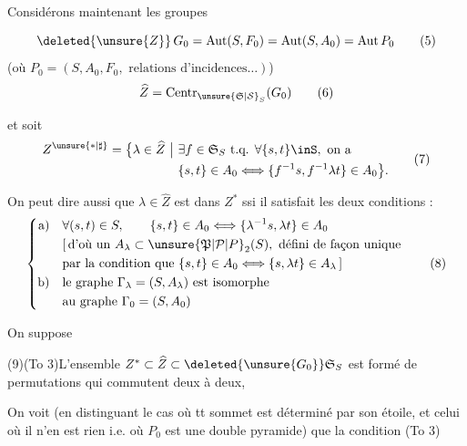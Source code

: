 Considérons maintenant les  groupes


\[
\deleted{\unsure{Z}}\,G_0=\mathrm{Aut}(S,F_0)=\mathrm{Aut}(S,A_0)=\mathrm{Aut}\,P_0\tag*{(5)}
\]
(où $P_0=(S,A_0,F_0,\text{ relations d'incidences}\ldots)$)
\[
\widehat Z=\mathrm{Centr}_{\unsure{\mathfrak S|\mathcal S}_S}(G_0)\tag*{(6)}
\]

 et soit
\[
\begin{aligned}
Z^{\unsure{*|\sharp}}=\bigl\{\lambda\in\widehat Z\ \big|\ &\exists f\in\mathfrak S_S\ \text{t.q. }\forall\{s,t\}\inS,\ \text{on a}\\
&\{s,t\}\in A_0\Longleftrightarrow\{f^{-1}s,f^{-1}\lambda t\}\in A_0\bigr\}.
\end{aligned}\tag*{(7)}
\]

 On peut dire aussi que $\lambda\in\widehat Z$ est dans $Z^*$ ssi il satisfait les deux conditions :
\[
\left\{\begin{aligned}
\mathrm a)\quad &\forall(s,t)\in S,\qquad\{s,t\}\in A_0\Longleftrightarrow\{\lambda^{-1}s,\lambda t\}\in A_0\\
&[\,\text{d'où un } A_\lambda\subset\unsure{\mathfrak P|\mathcal P|P}_2(S),\ \text{défini de façon unique}\\
&\text{par la condition que }\{s,t\}\in A_0\Longleftrightarrow\{s,\lambda t\}\in A_\lambda\,]\\
\mathrm b)\quad &\text{le graphe }\Gamma_\lambda=(S,A_\lambda)\text{ est isomorphe}\\
&\text{au graphe }\Gamma_0=(S,A_0)
\end{aligned}\right.\tag*{(8)}
\]

On suppose

(9)\qquad (To 3)\qquad L'ensemble $Z^*\subset\widehat Z\subset\deleted{\unsure{G_0}}\mathfrak S_S$ est formé de  permutations qui commutent deux à deux, 

On voit (en distinguant le cas où tt sommet est déterminé par son étoile, et celui où il n'en est rien i.e. où $P_0$ est une double pyramide) que la condition (To 3)



